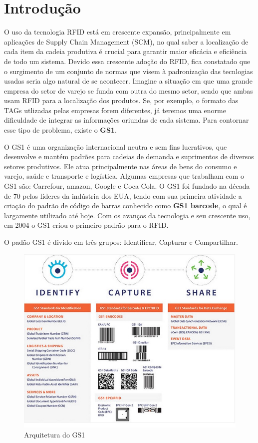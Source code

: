 \documentclass[a4paper,12pt,titlepage]{article}
\begin{document}
\section{Introdução}	
	O uso da tecnologia RFID está em crescente expansão, principalmente em aplicações de Supply Chain Management (SCM), no qual saber a localização de cada item da cadeia produtiva é crucial para garantir maior eficácia e eficiência de todo um sistema. Devido essa crescente adoção do RFID, fica constatado que o surgimento de um conjunto de normas que visem à padronização das tecnlogias usadas seria algo natural de se acontecer. Imagine a situação em que uma grande empresa do setor de varejo se funda com outra do mesmo setor, sendo que ambas usam RFID para a localização dos produtos. Se, por exemplo, o formato das TAGs utlizadas pelas empresas forem diferentes, já teremos uma enorme dificuldade de integrar as informações oriundas de cada sistema. Para contornar esse tipo de problema, existe o \textbf{GS1}.
	
	O GS1 é uma organização internacional neutra e sem fins lucrativos, que desenvolve e mantém padrões para cadeias de demanda e suprimentos de diversos setores produtivos. Ele atua principalmente nas áreas de bens do consumo e varejo, saúde e transporte e logística. Algumas empresas que trabalham com o GS1 são: Carrefour, amazon, Google e Coca Cola. 	
	O GS1 foi fundado na década de 70 pelos líderes da indústria dos EUA, tendo com sua primeira atividade a criação do padrão de código de barras conhecido como \textbf{GS1 barcode}, o qual é largamente utilizado até hoje. Com os avanços da tecnologia e seu crescente uso, em 2004 o GS1 criou o primeiro padrão para o RFID.

	O padão GS1 é divido em três grupos: Identificar, Capturar e Compartilhar. 
	\begin{figure}[h!]
		\centering
		\includegraphics[width=0.7\linewidth]{gs1arch}
		\caption{Arquitetura do GS1}
		\label{fig:gs1arch}
	\end{figure}
\end{document}

